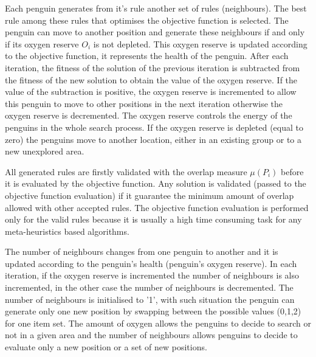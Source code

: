 \documentclass[preprint,12pt]{elsarticle}
\begin{document}
Each penguin generates from it's rule another set of rules (neighbours). The best rule among these rules that optimises the objective function is selected. The penguin can move to another position and generate these neighbours  if and only if its oxygen reserve \textbf{$O_{i}$} is not depleted. This oxygen reserve is updated according to the objective function, it represents the health of the penguin. After each iteration, the fitness of the solution of the previous iteration is subtracted from the fitness of the new solution to obtain the value of the oxygen reserve. If the value of the subtraction is positive, the oxygen reserve is incremented to allow this penguin to move to other positions in the next iteration otherwise the oxygen reserve is decremented. The oxygen reserve controls the energy of the penguins in the whole search process. If the oxygen reserve is depleted (equal to zero) the penguins move to another location, either in an existing group or to a new unexplored area. 

All generated rules are firstly validated with the overlap measure $\mu(P_{i})$ before it is evaluated by the objective function. Any solution is validated (passed to the objective function evaluation) if it guarantee the minimum amount of overlap allowed with other accepted rules. The objective function evaluation is performed only for the valid rules because it is usually a high time consuming task for any meta-heuristics based algorithms.

The number of neighbours changes from one penguin to another and it is updated according to the penguin's health (penguin's oxygen reserve). In each iteration, if the oxygen reserve is incremented the number of neighbours is also incremented, in the other case the number of neighbours is decremented. The number of neighbours is initialised to '1', with such situation the penguin can generate only one new position by swapping between the possible values (0,1,2) for one item set. The amount of oxygen allows the penguins to decide to search or not in a given area and the number of neighbours allows penguins to decide to evaluate only a new position or a set of new positions. 
\end{document}
